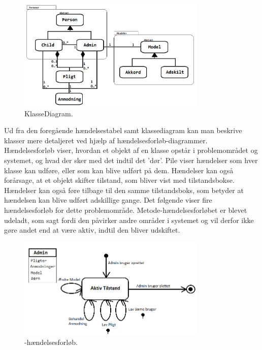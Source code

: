 \begin{figure}[H]
\centering
\includegraphics[width=0.8\textwidth]{Billeder/KlasseDiagram.png}
\caption{KlasseDiagram.}
\label{KlasseDiagram}
\end{figure}

Ud fra den foregående hændelsestabel samt klassediagram kan man beskrive klasser mere detaljeret ved hjælp af hændelsesforløb-diagrammer. Hændelsesforløb viser, hvordan et objekt af en klasse opstår i problemområdet og systemet, og hvad der sker med det indtil det ’dør’. Pile viser hændelser som hver klasse kan udføre, eller som kan blive udført på dem. Hændelser kan også forårsage, at et objekt skifter tilstand, som bliver vist med tilstandsbokse. Hændelser kan også føre tilbage til den samme tilstandsboks, som betyder at hændelsen kan blive udført adskillige gange. Det følgende viser fire hændelsesforløb for dette problemområde. Metode-hændelsesforløbet er blevet udeladt, som sagt fordi den påvirker andre områder i systemet og vil derfor ikke gøre andet end at være aktiv, indtil den bliver udskiftet.

\begin{figure}[H]
\centering
\includegraphics[width=0.8\textwidth]{Billeder/ForaelderForloeb.png}
\caption{-hændelsesforløb.}
\label{ForaelderHaendelsesforloeb}
\end{figure}

